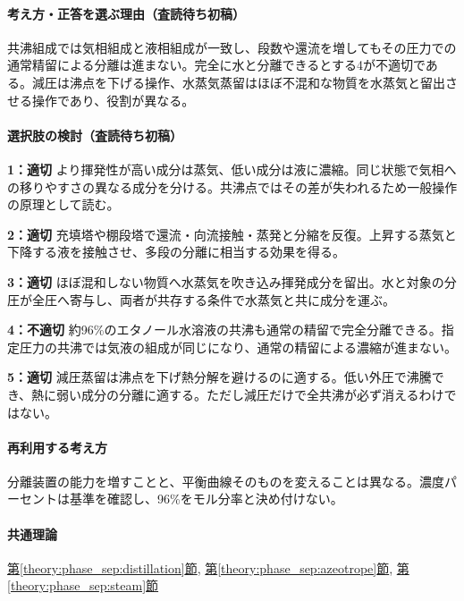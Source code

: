 \paragraph{考え方・正答を選ぶ理由（査読待ち初稿）} 共沸組成では気相組成と液相組成が一致し、段数や還流を増してもその圧力での通常精留による分離は進まない。完全に水と分離できるとする4が不適切である。減圧は沸点を下げる操作、水蒸気蒸留はほぼ不混和な物質を水蒸気と留出させる操作であり、役割が異なる。

\paragraph{選択肢の検討（査読待ち初稿）}\mbox{}\par

\noindent\textbf{1：適切} より揮発性が高い成分は蒸気、低い成分は液に濃縮。同じ状態で気相への移りやすさの異なる成分を分ける。共沸点ではその差が失われるため一般操作の原理として読む。\par

\noindent\textbf{2：適切} 充填塔や棚段塔で還流・向流接触・蒸発と分縮を反復。上昇する蒸気と下降する液を接触させ、多段の分離に相当する効果を得る。\par

\noindent\textbf{3：適切} ほぼ混和しない物質へ水蒸気を吹き込み揮発成分を留出。水と対象の分圧が全圧へ寄与し、両者が共存する条件で水蒸気と共に成分を運ぶ。\par

\noindent\textbf{4：不適切} 約96\%のエタノール水溶液の共沸も通常の精留で完全分離できる。指定圧力の共沸では気液の組成が同じになり、通常の精留による濃縮が進まない。\par

\noindent\textbf{5：適切} 減圧蒸留は沸点を下げ熱分解を避けるのに適する。低い外圧で沸騰でき、熱に弱い成分の分離に適する。ただし減圧だけで全共沸が必ず消えるわけではない。\par

\paragraph{再利用する考え方} 分離装置の能力を増すことと、平衡曲線そのものを変えることは異なる。濃度パーセントは基準を確認し、96\%をモル分率と決め付けない。

\paragraph{共通理論} \hyperref[theory:phase_sep:distillation]{第\ref*{theory:phase_sep:distillation}節}, \hyperref[theory:phase_sep:azeotrope]{第\ref*{theory:phase_sep:azeotrope}節}, \hyperref[theory:phase_sep:steam]{第\ref*{theory:phase_sep:steam}節}

